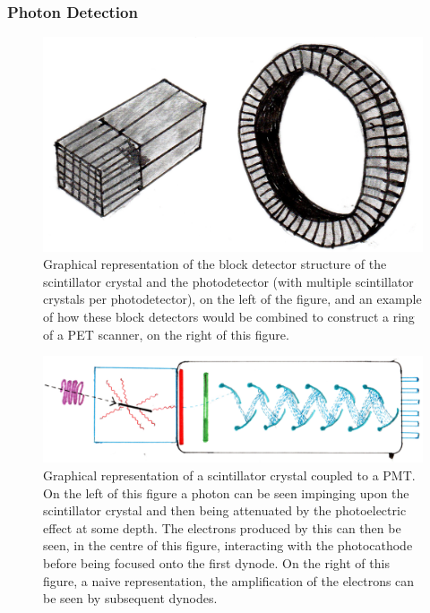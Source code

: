             \subsubsection{Photon Detection} \label{sec:photon_detection}
                \begin{figure}
                    \centering
                    
                    \includegraphics[width=1.0\linewidth]{figures/background_detector.png}
                    
                    \captionsetup{singlelinecheck=false, justification=raggedright}
                    \caption{Graphical representation of the block detector structure of the scintillator crystal and the photodetector (with multiple scintillator crystals per photodetector), on the left of the figure, and an example of how these block detectors would be combined to construct a ring of a \gls{PET} scanner, on the right of this figure.} \label{fig:photon_detection_detector}
                \end{figure}
                
                \begin{figure}
                    \centering
                    
                    \includegraphics[width=1.0\linewidth]{figures/background_photomultiplier.png}
                    
                    \captionsetup{singlelinecheck=false, justification=raggedright}
                    \caption{Graphical representation of a scintillator crystal coupled to a \gls{PMT}. On the left of this figure a photon can be seen impinging upon the scintillator crystal and then being attenuated by the photoelectric effect at some depth. The electrons produced by this can then be seen, in the centre of this figure, interacting with the photocathode before being focused onto the first dynode. On the right of this figure, a naive representation, the amplification of the electrons can be seen by subsequent dynodes.} \label{fig:photon_detection_photomultiplier}
                \end{figure}
                
